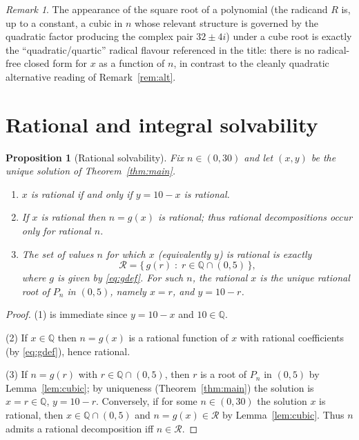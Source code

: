 \documentclass{amsart}
\newtheorem{proposition}{Proposition}
\theoremstyle{remark}
\newtheorem{remark}{Remark}
\begin{document}
\begin{remark}
The appearance of the square root of a polynomial (the radicand $R$ is, up to a
constant, a cubic in $n$ whose relevant structure is governed by the quadratic
factor producing the complex pair $32\pm4i$) under a cube root is exactly the
``quadratic/quartic'' radical flavour referenced in the title: there is no
radical-free closed form for $x$ as a function of $n$, in contrast to the
cleanly quadratic alternative reading of Remark~\ref{rem:alt}.
\end{remark}

\section{Rational and integral solvability}

\begin{proposition}[Rational solvability]\label{prop:rat}
Fix $n\in(0,30)$ and let $(x,y)$ be the unique solution of
Theorem~\ref{thm:main}.
\begin{enumerate}
\item $x$ is rational if and only if $y=10-x$ is rational.
\item If $x$ is rational then $n=g(x)$ is rational; thus rational
decompositions occur only for rational $n$.
\item The set of values $n$ for which $x$ (equivalently $y$) is rational is
exactly
\[
\mathcal{R}=\bigl\{\,g(r)\;:\; r\in\mathbb{Q}\cap(0,5)\,\bigr\},
\]
where $g$ is given by \eqref{eq:gdef}. For such $n$, the rational $x$ is the
unique rational root of $P_n$ in $(0,5)$, namely $x=r$, and $y=10-r$.
\end{enumerate}
\end{proposition}

\begin{proof}
(1) is immediate since $y=10-x$ and $10\in\mathbb{Q}$.

(2) If $x\in\mathbb{Q}$ then $n=g(x)$ is a rational function of $x$ with
rational coefficients (by \eqref{eq:gdef}), hence rational.

(3) If $n=g(r)$ with $r\in\mathbb{Q}\cap(0,5)$, then $r$ is a root of $P_n$
in $(0,5)$ by Lemma~\ref{lem:cubic}; by uniqueness (Theorem~\ref{thm:main})
the solution is $x=r\in\mathbb{Q}$, $y=10-r$. Conversely, if for some
$n\in(0,30)$ the solution $x$ is rational, then $x\in\mathbb{Q}\cap(0,5)$ and
$n=g(x)\in\mathcal R$ by Lemma~\ref{lem:cubic}. Thus $n$ admits a rational
decomposition iff $n\in\mathcal R$.
\end{proof}
\end{document}
